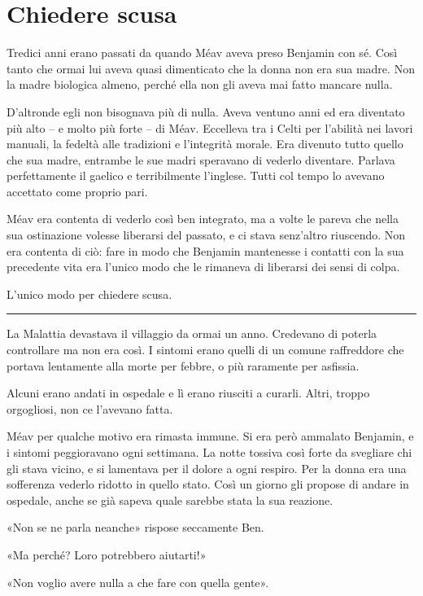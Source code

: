 \chapter{Chiedere scusa}
\label{ch:chiedere-scusa}

Tredici anni erano passati da quando Méav aveva preso Benjamin con sé. Così tanto che ormai lui
aveva quasi dimenticato che la donna non era sua madre. Non la madre biologica almeno, perché ella
non gli aveva mai fatto mancare nulla.

D'altronde egli non bisognava più di nulla. Aveva ventuno anni ed era diventato più alto -- e molto
più forte -- di Méav. Eccelleva tra i Celti per l'abilità nei lavori manuali, la fedeltà alle
tradizioni e l'integrità morale. Era divenuto tutto quello che sua madre, entrambe le sue madri
speravano di vederlo diventare. Parlava perfettamente il gaelico e terribilmente l'inglese. Tutti
col tempo lo avevano accettato come proprio pari.

Méav era contenta di vederlo così ben integrato, ma a volte le pareva che nella sua ostinazione
volesse liberarsi del passato, e ci stava senz'altro riuscendo. Non era contenta di ciò: fare in
modo che Benjamin mantenesse i contatti con la sua precedente vita era l'unico modo che le rimaneva
di liberarsi dei sensi di colpa.

L'unico modo per chiedere scusa.

\plainbreak{1}

La Malattia devastava il villaggio da ormai un anno. Credevano di poterla controllare ma non era
così. I sintomi erano quelli di un comune raffreddore che portava lentamente alla morte per febbre,
o più raramente per asfissia.

Alcuni erano andati in ospedale e lì erano riusciti a curarli. Altri, troppo orgogliosi, non ce
l'avevano fatta.

Méav per qualche motivo era rimasta immune. Si era però ammalato Benjamin, e i sintomi peggioravano
ogni settimana. La notte tossiva così forte da svegliare chi gli stava vicino, e si lamentava per il
dolore a ogni respiro. Per la donna era una sofferenza vederlo ridotto in quello stato. Così un
giorno gli propose di andare in ospedale, anche se già sapeva quale sarebbe stata la sua reazione.

«Non se ne parla neanche» rispose seccamente Ben.

«Ma perché? Loro potrebbero aiutarti!»

«Non voglio avere nulla a che fare con quella gente».

